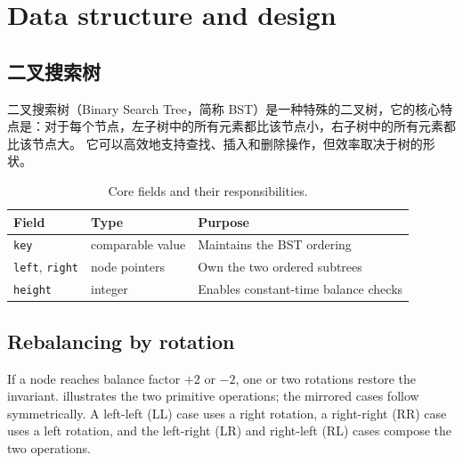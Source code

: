 \documentclass[lang=cn,a4paper,newtx,bibend=biber]{elegantpaper}
\newcommand{\code}[1]{\texttt{#1}}
\begin{document}
\section{Data structure and design}
\subsection{二叉搜索树}
\begin{definition}
二叉搜索树（Binary Search Tree，简称 BST）是一种特殊的二叉树，它的核心特点是：对于每个节点，左子树中的所有元素都比该节点小，右子树中的所有元素都比该节点大。
它可以高效地支持查找、插入和删除操作，但效率取决于树的形状。
\end{definition}

\begin{table}[H]
\centering
\caption{Core fields and their responsibilities.}
\label{tab:node}
\begin{tabular}{@{}lll@{}}
\toprule
Field & Type & Purpose \\
\midrule
\code{key} & comparable value & Maintains the BST ordering \\
\code{left}, \code{right} & node pointers & Own the two ordered subtrees \\
\code{height} & integer & Enables constant-time balance checks \\
\bottomrule
\end{tabular}
\end{table}

\subsection{Rebalancing by rotation}
If a node reaches balance factor $+2$ or $-2$, one or two rotations restore the invariant.  illustrates the two primitive operations; the mirrored cases follow symmetrically. A left-left (LL) case uses a right rotation, a right-right (RR) case uses a left rotation, and the left-right (LR) and right-left (RL) cases compose the two operations.
\end{document}
